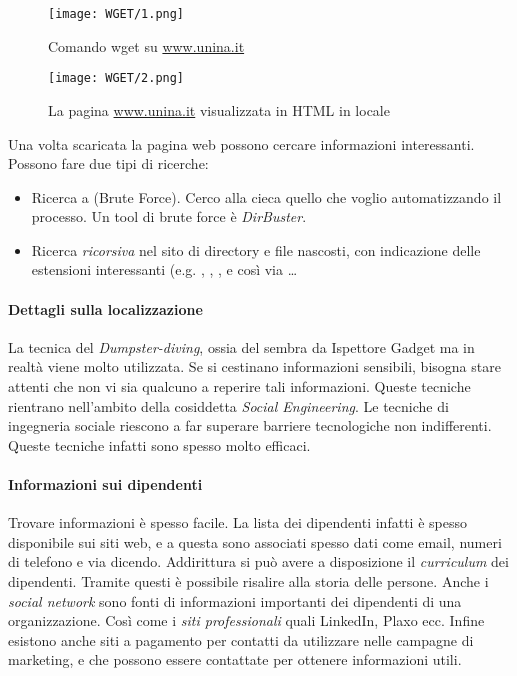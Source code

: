 \documentclass[14pt]{extreport}
\begin{document}
\begin{figure}[H]
    \centering
    \texttt{[image: WGET/1.png]}
    \caption{Comando wget su \url{www.unina.it}}
\end{figure}

\begin{figure}[H]
    \centering
    \texttt{[image: WGET/2.png]}
    \caption{La pagina \url{www.unina.it} visualizzata in HTML in locale}
\end{figure}



Una volta scaricata la pagina web possono cercare informazioni interessanti. Possono fare due tipi di ricerche:

\begin{itemize}
    \item Ricerca a  (Brute Force). Cerco alla cieca quello che voglio automatizzando il processo. Un tool di brute force è \textit{DirBuster}.
    \item Ricerca \textit{ricorsiva} nel sito di directory e file nascosti, con indicazione delle estensioni interessanti (e.g. , , ,  e così via \ldots
\end{itemize}


\paragraph{Dettagli sulla localizzazione}
La tecnica del \textit{Dumpster-diving}, ossia del  sembra da Ispettore Gadget ma in realtà viene molto utilizzata. Se si cestinano informazioni sensibili, bisogna stare attenti che non vi sia qualcuno a reperire tali informazioni. Queste tecniche rientrano nell'ambito della cosiddetta \textit{Social Engineering}.
Le tecniche di ingegneria sociale riescono a far superare barriere tecnologiche non indifferenti. Queste tecniche infatti sono spesso molto efficaci.



\paragraph{Informazioni sui dipendenti}
Trovare informazioni è spesso facile. La lista dei dipendenti infatti è spesso disponibile sui siti web, e a questa sono associati spesso dati come email, numeri di telefono e via dicendo. Addirittura si può avere a disposizione il \textit{curriculum} dei dipendenti. Tramite questi è possibile risalire alla storia delle persone.
Anche i \textit{social network} sono fonti di informazioni importanti dei dipendenti di una organizzazione. Così come i \textit{siti professionali} quali LinkedIn, Plaxo ecc.
Infine esistono anche siti a pagamento per contatti da utilizzare nelle campagne di marketing, e che possono essere contattate per ottenere informazioni utili.
\end{document}
